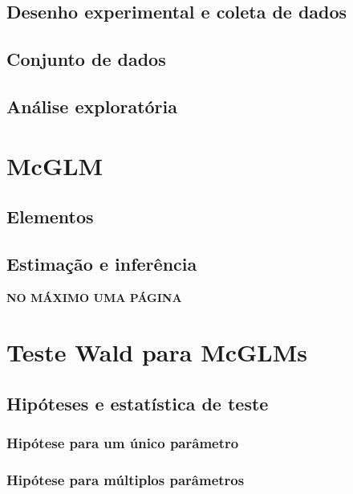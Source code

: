 \documentclass[AMA,STIX1COL]{WileyNJD-v2}
\begin{document}
\subsection{Desenho experimental e coleta de dados}

\subsection{Conjunto de dados}

\subsection{Análise exploratória}
  

\section{McGLM}\label{sec3}

\subsection{Elementos}

\subsection{Estimação e inferência}

\textbf{NO MÁXIMO UMA PÁGINA}


\section{Teste Wald para McGLMs}\label{sec4}

\subsection{Hipóteses e estatística de teste}

\subsubsection{Hipótese para um único parâmetro}

\subsubsection{Hipótese para múltiplos parâmetros}
\end{document}
